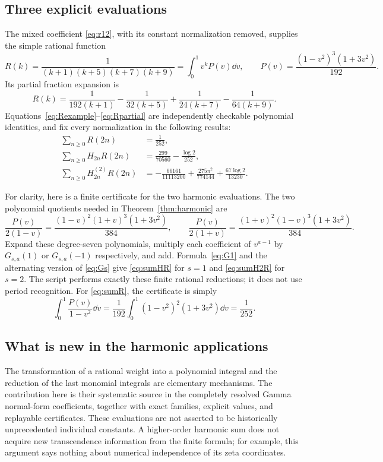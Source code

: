 \subsection{Three explicit evaluations}

The mixed coefficient \eqref{eq:r12}, with its constant normalization removed, supplies the simple rational function
\begin{equation}\label{eq:Rexample}
 R(k)=\frac1{(k+1)(k+5)(k+7)(k+9)}
     =\int_0^1v^kP(v)\dd v,
 \qquad P(v)=\frac{(1-v^2)^3(1+3v^2)}{192}.
\end{equation}
Its partial fraction expansion is
\begin{equation}\label{eq:Rpartial}
 R(k)=\frac1{192(k+1)}-\frac1{32(k+5)}
       +\frac1{24(k+7)}-\frac1{64(k+9)}.
\end{equation}
Equations~\eqref{eq:Rexample}--\eqref{eq:Rpartial} are independently checkable polynomial identities, and fix every normalization in the following results:
\begin{align}
 \sum_{n\ge0}R(2n)&=\frac1{252},\label{eq:sumR}\\
 \sum_{n\ge0}H_{2n}R(2n)
   &=\frac{299}{70560}-\frac{\log2}{252},\label{eq:sumHR}\\
 \sum_{n\ge0}H_{2n}^{(2)}R(2n)
   &=-\frac{66161}{11113200}
      +\frac{275\pi^2}{774144}
      +\frac{67\log2}{13230}.\label{eq:sumH2R}
\end{align}

For clarity, here is a finite certificate for the two harmonic evaluations. The two polynomial quotients needed in Theorem~\ref{thm:harmonic} are
\[
 \frac{P(v)}{2(1-v)}=
 \frac{(1-v)^2(1+v)^3(1+3v^2)}{384},\qquad
 \frac{P(v)}{2(1+v)}=
 \frac{(1+v)^2(1-v)^3(1+3v^2)}{384}.
\]
Expand these degree-seven polynomials, multiply each coefficient of $v^{a-1}$ by $G_{s,a}(1)$ or $G_{s,a}(-1)$ respectively, and add. Formula~\eqref{eq:G1} and the alternating version of \eqref{eq:Gs} give \eqref{eq:sumHR} for $s=1$ and \eqref{eq:sumH2R} for $s=2$. The script  performs exactly these finite rational reductions; it does not use period recognition. For \eqref{eq:sumR}, the certificate is simply
\[
 \int_0^1\frac{P(v)}{1-v^2}\dd v
 =\frac1{192}\int_0^1(1-v^2)^2(1+3v^2)\dd v=\frac1{252}.
\]

\subsection{What is new in the harmonic applications}

The transformation of a rational weight into a polynomial integral and the reduction of the last monomial integrals are elementary mechanisms. The contribution here is their systematic source in the completely resolved Gamma normal-form coefficients, together with exact families, explicit values, and replayable certificates. These evaluations are not asserted to be historically unprecedented individual constants. A higher-order harmonic sum does not acquire new transcendence information from the finite formula; for example, this argument says nothing about numerical independence of its zeta coordinates.
